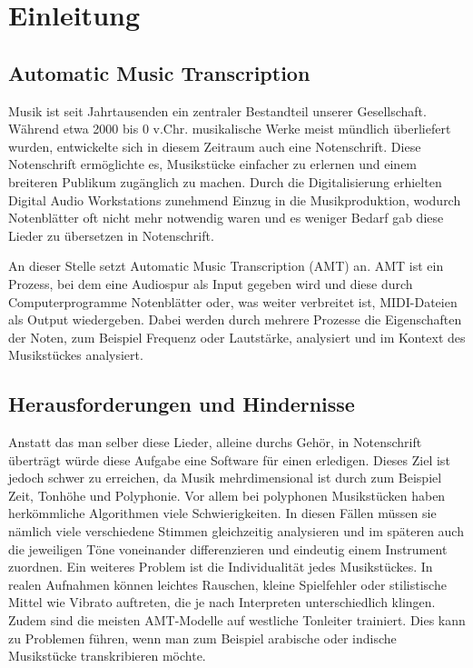 \section{Einleitung}

\subsection{Automatic Music Transcription}
Musik ist seit Jahrtausenden ein zentraler Bestandteil unserer Gesellschaft.
Während etwa 2000 bis 0 v.Chr. musikalische Werke meist mündlich überliefert wurden,
entwickelte sich in diesem Zeitraum auch eine Notenschrift.
Diese Notenschrift ermöglichte es, Musikstücke einfacher zu erlernen und einem breiteren Publikum zugänglich zu machen.
Durch die Digitalisierung erhielten Digital Audio Workstations zunehmend Einzug in die Musikproduktion,
wodurch Notenblätter oft nicht mehr notwendig waren und es weniger Bedarf gab diese Lieder zu übersetzen in Notenschrift.

An dieser Stelle setzt Automatic Music Transcription (AMT) an.
AMT ist ein Prozess, bei dem eine Audiospur als Input gegeben wird und diese durch Computerprogramme
Notenblätter oder, was weiter verbreitet ist, MIDI-Dateien als Output wiedergeben.
Dabei werden durch mehrere Prozesse die Eigenschaften der Noten, zum Beispiel Frequenz oder Lautstärke,
analysiert und im Kontext des Musikstückes analysiert.

\subsection{Herausforderungen und Hindernisse}
Anstatt das man selber diese Lieder, alleine durchs Gehör,
in Notenschrift überträgt würde diese Aufgabe eine Software für einen erledigen.
Dieses Ziel ist jedoch schwer zu erreichen,
da Musik mehrdimensional ist durch zum Beispiel Zeit, Tonhöhe und Polyphonie.
Vor allem bei polyphonen Musikstücken haben herkömmliche Algorithmen viele Schwierigkeiten.
In diesen Fällen müssen sie nämlich viele verschiedene Stimmen gleichzeitig analysieren und
im späteren auch die jeweiligen Töne voneinander differenzieren und eindeutig einem Instrument zuordnen.
Ein weiteres Problem ist die Individualität jedes Musikstückes.
In realen Aufnahmen können leichtes Rauschen,
kleine Spielfehler oder stilistische Mittel wie Vibrato auftreten,
die je nach Interpreten unterschiedlich klingen.
Zudem sind die meisten AMT-Modelle auf westliche Tonleiter trainiert.
Dies kann zu Problemen führen, wenn man zum Beispiel
arabische oder indische Musikstücke transkribieren möchte.

